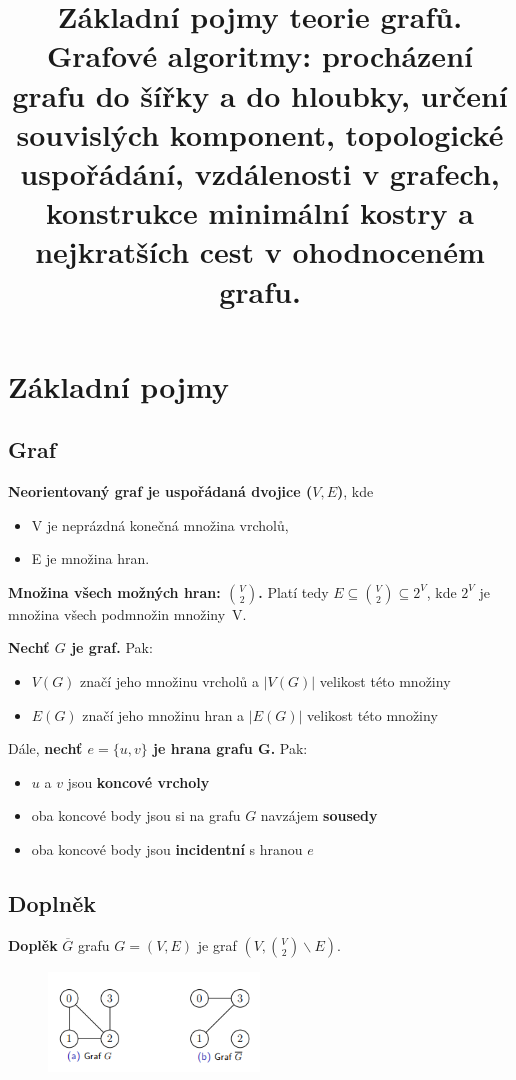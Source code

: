 \documentclass{szzclass}
\title{Základní pojmy teorie grafů. \\
\large Grafové algoritmy:   procházení grafu do šířky a do hloubky, určení souvislých komponent,   topologické uspořádání, vzdálenosti v grafech, konstrukce minimální kostry a nejkratších cest v ohodnoceném grafu.}
\begin{document}
\maketitle

\tableofcontents
\newpage

\section{Základní pojmy}

\subsection{Graf}

\textbf{Neorientovaný graf je uspořádaná dvojice ($V, E$)}, kde
\begin{itemize}
    \item V je neprázdná konečná množina vrcholů,
    \item E je množina hran.
\end{itemize}

\textbf{Množina všech možných hran: $\binom{V}{2}$.}\newline
Platí tedy $E \subseteq \binom{V}{2} \subseteq 2^V$, kde $2^V$ je množina všech podmnožin množiny~V.

\textbf{Nechť $G$ je graf.} Pak:
\begin{itemize}
    \item $V(G)$ značí jeho množinu vrcholů a $|V(G)|$  velikost této množiny
    \item $E(G)$ značí jeho množinu hran a $|E(G)|$  velikost této množiny
\end{itemize}

Dále, \textbf{nechť $e = \{u, v\}$ je hrana grafu G.} Pak:
\begin{itemize}
    \item $u$ a $v$ jsou \textbf{koncové vrcholy}
    \item oba koncové body jsou si na grafu $G$ navzájem \textbf{sousedy}
    \item oba koncové body jsou \textbf{incidentní} s hranou $e$
\end{itemize}

\subsection{Doplněk}
\textbf{Doplěk} $\overline{G}$ grafu $G = (V, E)$ je graf $(V, \binom{V}{2} \backslash E)$.

\begin{figure}[h]
\includegraphics[width=0.5\textwidth]{topics/bi-spol-4/images/doplnek.PNG}
\end{figure}
\end{document}
